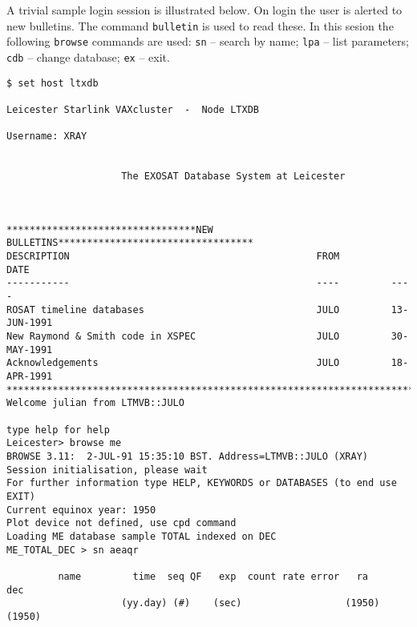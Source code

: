 A trivial sample login session is illustrated below. On login the user is 
alerted to new bulletins. The command {\tt bulletin} is used to read these.
In this sesion the following 
{\tt browse} commands are used: {\tt sn} -- search by name; 
{\tt lpa} -- list parameters; {\tt cdb} -- change database; {\tt ex} -- exit.

\begin{verbatim}
$ set host ltxdb

Leicester Starlink VAXcluster  -  Node LTXDB

Username: XRAY


                    The EXOSAT Database System at Leicester



*********************************NEW BULLETINS**********************************
DESCRIPTION                                           FROM         DATE
-----------                                           ----         ----
ROSAT timeline databases                              JULO         13-JUN-1991
New Raymond & Smith code in XSPEC                     JULO         30-MAY-1991
Acknowledgements                                      JULO         18-APR-1991
********************************************************************************
Welcome julian from LTMVB::JULO

type help for help
Leicester> browse me
BROWSE 3.11:  2-JUL-91 15:35:10 BST. Address=LTMVB::JULO (XRAY)
Session initialisation, please wait
For further information type HELP, KEYWORDS or DATABASES (to end use EXIT)
Current equinox year: 1950
Plot device not defined, use cpd command
Loading ME database sample TOTAL indexed on DEC
ME_TOTAL_DEC > sn aeaqr

         name         time  seq QF   exp  count rate error   ra        dec
                    (yy.day) (#)    (sec)                  (1950)     (1950)


\end{verbatim}
